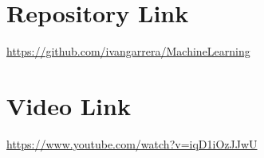\documentclass[twoside]{plantilla}
\begin{document}

\tableofcontents
\newpage







\section{Repository Link}
\url{https://github.com/ivangarrera/MachineLearning}
\section{Video Link}
\url{https://www.youtube.com/watch?v=iqD1iOzJJwU}
\end{document}
